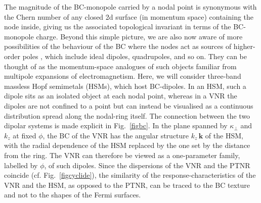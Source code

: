 \documentclass[aps,prb,onecolumn,nofootinbib,citeautoscript,10pt]{revtex4-2}
\newcommand{\bs}[1]{\boldsymbol{#1}}
\begin{document}
The magnitude of the BC-monopole carried by a nodal point is synonymous with the Chern number of any closed 2d surface (in momentum space) containing the node inside, giving us the associated topological invariant in terms of the BC-monopole charge. Beyond this simple picture, we are also now aware of more possibilities of the behaviour of the BC where the nodes act as sources of higher-order poles \cite{graf-hopf, hopf2, hopf3,  ips-fa, ips-fa-lett}, which include ideal dipoles, quadrupoles, and so on. They can be thought of as the momentum-space analogues of such objects familiar from multipole expansions of electromagnetism. Here, we will consider three-band massless Hopf semimetals (HSMs), which host BC-dipoles. In an HSM, such a dipole sits as an isolated object at each nodal point, whereas in a VNR the dipoles are not confined to a point but can instead be visualised as a continuous distribution spread along the nodal-ring itself. 
The connection between the two dipolar systems is made explicit in Fig.~\ref{figbc}. In the plane spanned by $\kappa_\perp$ and $k_z$ at fixed $\phi$, the BC of the VNR has the angular structure $k_z\,\bs k$ of the HSM, with the radial dependence of the HSM replaced by the one set by the distance from the ring. The VNR can therefore be viewed as a one-parameter family, labelled by $\phi$, of such dipoles. Since the dispersions of the VNR and the PTNR coincide (cf. Fig.~\ref{figcyclide}), the similarity of the response-characteristics of the VNR and the HSM, as opposed to the PTNR, can be traced to the BC texture and not to the shapes of the Fermi surfaces.
\end{document}
